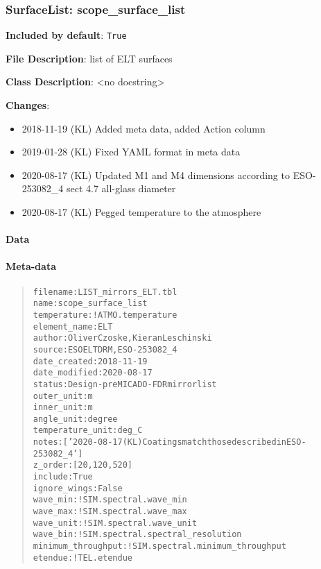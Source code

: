 \subsubsection{SurfaceList: \textquotedbl{}scope\_surface\_list\textquotedbl{}%
  \label{surfacelist-scope-surface-list}%
}

\textbf{Included by default}: \texttt{True}

\textbf{File Description}: list of ELT surfaces

\textbf{Class Description}: <no docstring>

\textbf{Changes}:

\begin{itemize}
\item 2018-11-19 (KL) Added meta data, added Action column

\item 2019-01-28 (KL) Fixed YAML format in meta data

\item 2020-08-17 (KL) Updated M1 and M4 dimensions according to ESO-253082\_4 sect 4.7 \textquotedbl{}all-glass\textquotedbl{} diameter

\item 2020-08-17 (KL) Pegged temperature to the atmosphere
\end{itemize}


\paragraph{Data%
  \label{data}%
}


\paragraph{Meta-data%
  \label{meta-data}%
}

\begin{quote}
\begin{alltt}
          filename : LIST_mirrors_ELT.tbl
              name : scope_surface_list
       temperature : !ATMO.temperature
      element_name : ELT
            author : Oliver Czoske, Kieran Leschinski
            source : ESO ELT DRM, ESO-253082_4
      date_created : 2018-11-19
     date_modified : 2020-08-17
            status : Design - pre MICADO-FDR mirror list
        outer_unit : m
        inner_unit : m
        angle_unit : degree
  temperature_unit : deg_C
             notes : ['2020-08-17 (KL) Coatings match those described in ESO-253082_4']
           z_order : [20, 120, 520]
           include : True
      ignore_wings : False
          wave_min : !SIM.spectral.wave_min
          wave_max : !SIM.spectral.wave_max
         wave_unit : !SIM.spectral.wave_unit
          wave_bin : !SIM.spectral.spectral_resolution
minimum_throughput : !SIM.spectral.minimum_throughput
           etendue : !TEL.etendue
\end{alltt}
\end{quote}



